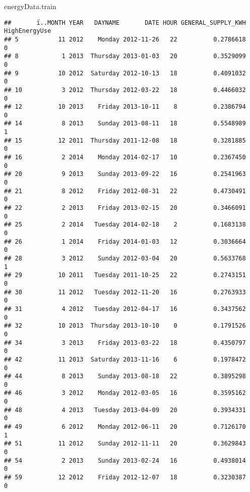 \documentclass[
]{article}
\newenvironment{Shaded}{\begin{snugshade}}{\end{snugshade}}
\newcommand{\NormalTok}[1]{#1}
\begin{document}
\begin{Shaded}
\begin{Highlighting}[]
\NormalTok{energyData.train}
\end{Highlighting}
\end{Shaded}

\begin{verbatim}
##       ï..MONTH YEAR   DAYNAME       DATE HOUR GENERAL_SUPPLY_KWH HighEnergyUse
## 5           11 2012    Monday 2012-11-26   22          0.2786618             0
## 8            1 2013  Thursday 2013-01-03   20          0.3529099             0
## 9           10 2012  Saturday 2012-10-13   18          0.4091032             0
## 10           3 2012  Thursday 2012-03-22   18          0.4466032             0
## 12          10 2013    Friday 2013-10-11    8          0.2386794             0
## 14           8 2013    Sunday 2013-08-11   18          0.5548989             1
## 15          12 2011  Thursday 2011-12-08   18          0.3281885             0
## 16           2 2014    Monday 2014-02-17   10          0.2367450             0
## 20           9 2013    Sunday 2013-09-22   16          0.2541963             0
## 21           8 2012    Friday 2012-08-31   22          0.4730491             0
## 22           2 2013    Friday 2013-02-15   20          0.3466091             0
## 25           2 2014   Tuesday 2014-02-18    2          0.1683138             0
## 26           1 2014    Friday 2014-01-03   12          0.3036664             0
## 28           3 2012    Sunday 2012-03-04   20          0.5633768             1
## 29          10 2011   Tuesday 2011-10-25   22          0.2743151             0
## 30          11 2012   Tuesday 2012-11-20   16          0.2763933             0
## 31           4 2012   Tuesday 2012-04-17   16          0.3437562             0
## 32          10 2013  Thursday 2013-10-10    0          0.1791526             0
## 34           3 2013    Friday 2013-03-22   18          0.4350797             0
## 42          11 2013  Saturday 2013-11-16    6          0.1978472             0
## 44           8 2013    Sunday 2013-08-18   22          0.3895298             0
## 46           3 2012    Monday 2012-03-05   16          0.3595162             0
## 48           4 2013   Tuesday 2013-04-09   20          0.3934331             0
## 49           6 2012    Monday 2012-06-11   20          0.7126170             1
## 51          11 2012    Sunday 2012-11-11   20          0.3629843             0
## 54           2 2013    Sunday 2013-02-24   16          0.4938014             0
## 59          12 2012    Friday 2012-12-07   18          0.3230387             0

\end{verbatim}
\end{document}
